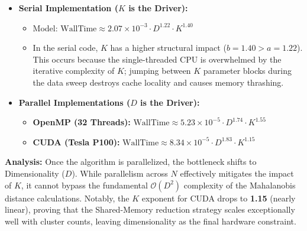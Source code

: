 \documentclass[10pt]{article}
\begin{document}
\begin{itemize}
    \item \textbf{Serial Implementation ($K$ is the Driver):}
    \begin{itemize}
        \item Model: $\text{WallTime} \approx 2.07 \times 10^{-3} \cdot D^{1.22} \cdot K^{1.40}$
        \item In the serial code, $K$ has a higher structural impact ($b=1.40 > a=1.22$). This occurs because the single-threaded CPU is overwhelmed by the iterative complexity of $K$; jumping between $K$ parameter blocks during the data sweep destroys cache locality and causes memory thrashing.
    \end{itemize}
    \item \textbf{Parallel Implementations ($D$ is the Driver):}
    \begin{itemize}
        \item \textbf{OpenMP (32 Threads):} $\text{WallTime} \approx 5.23 \times 10^{-5} \cdot D^{1.74} \cdot K^{1.55}$
        \item \textbf{CUDA (Tesla P100):} $\text{WallTime} \approx 8.34 \times 10^{-5} \cdot D^{1.83} \cdot K^{1.15}$
    \end{itemize}
\end{itemize}

\textbf{Analysis:} Once the algorithm is parallelized, the bottleneck shifts to Dimensionality ($D$). While parallelism across $N$ effectively mitigates the impact of $K$, it cannot bypass the fundamental $\mathcal{O}(D^2)$ complexity of the Mahalanobis distance calculations. Notably, the $K$ exponent for CUDA drops to \textbf{1.15} (nearly linear), proving that the Shared-Memory reduction strategy scales exceptionally well with cluster counts, leaving dimensionality as the final hardware constraint.
\end{document}
